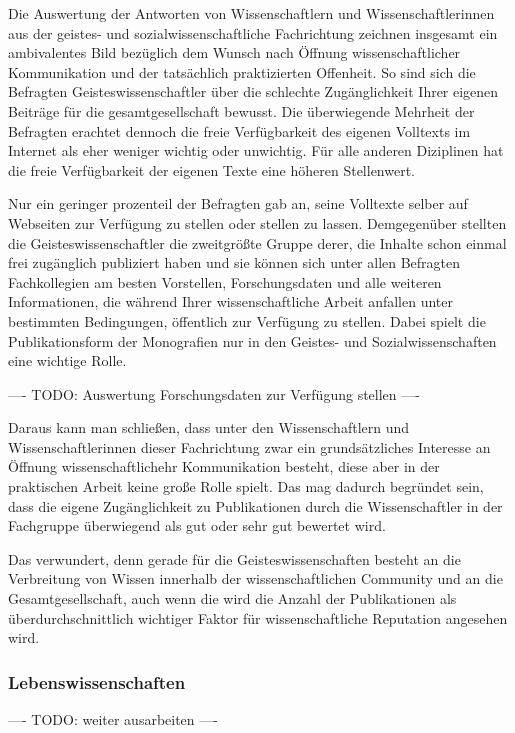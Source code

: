Die Auswertung der Antworten von Wissenschaftlern und Wissenschaftlerinnen aus der geistes- und sozialwissenschaftliche Fachrichtung zeichnen insgesamt ein ambivalentes Bild bezüglich dem Wunsch nach Öffnung wissenschaftlicher Kommunikation und der tatsächlich praktizierten Offenheit. So sind sich die Befragten Geisteswissenschaftler über die schlechte Zugänglichkeit Ihrer eigenen Beiträge für die gesamtgesellschaft bewusst. Die überwiegende Mehrheit der Befragten erachtet dennoch die freie Verfügbarkeit des eigenen Volltexts im Internet als eher weniger wichtig oder unwichtig. Für alle anderen Diziplinen hat die freie Verfügbarkeit der eigenen Texte eine höheren Stellenwert.

Nur ein geringer prozenteil der Befragten gab an, seine Volltexte selber auf Webseiten zur Verfügung zu stellen oder stellen zu lassen. Demgegenüber stellten die Geisteswissenschaftler die zweitgrößte Gruppe derer, die Inhalte schon einmal frei zugänglich publiziert haben und sie können sich unter allen Befragten Fachkollegien am besten Vorstellen, Forschungsdaten und alle weiteren Informationen, die während Ihrer wissenschaftliche Arbeit anfallen unter bestimmten Bedingungen, öffentlich zur Verfügung zu stellen.
Dabei spielt die Publikationsform der Monografien nur in den Geistes- und Sozialwissenschaften eine wichtige Rolle.

---- TODO: Auswertung Forschungsdaten zur Verfügung stellen  ----

Daraus kann man schließen, dass unter den Wissenschaftlern und Wissenschaftlerinnen dieser Fachrichtung zwar ein grundsätzliches Interesse an Öffnung wissenschaftlichehr Kommunikation besteht, diese aber in der praktischen Arbeit keine große Rolle spielt. Das mag dadurch begründet sein, dass die eigene Zugänglichkeit zu Publikationen durch die Wissenschaftler in der Fachgruppe überwiegend als gut oder sehr gut bewertet wird.

Das verwundert, denn gerade für die Geisteswissenschaften besteht an die Verbreitung von Wissen innerhalb der wissenschaftlichen Community und an die Gesamtgesellschaft, auch wenn die wird die Anzahl der Publikationen als überdurchschnittlich wichtiger Faktor für wissenschaftliche Reputation angesehen wird.

\subsubsection{Lebenswissenschaften}

---- TODO: weiter ausarbeiten ----

